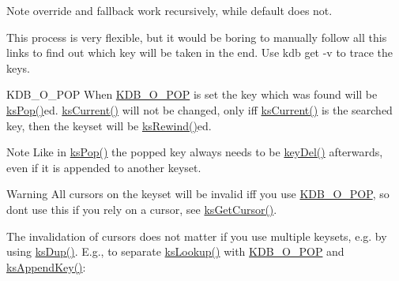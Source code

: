 \begin{DoxyNote}{Note}
override and fallback work recursively, while default does not.
\end{DoxyNote}
This process is very flexible, but it would be boring to manually follow all this links to find out which key will be taken in the end. Use {\ttfamily kdb get -\/v} to trace the keys.

\begin{DoxyParagraph}{K\+D\+B\+\_\+\+O\+\_\+\+P\+OP}
When \hyperlink{group__keyset_ggada05f4bbf46fde81d0d57df86e73d914a52fb5f2cc86773d393da62bebebf7984}{K\+D\+B\+\_\+\+O\+\_\+\+P\+OP} is set the key which was found will be \hyperlink{group__keyset_gae42530b04defb772059de0600159cf69}{ks\+Pop()}ed. \hyperlink{group__keyset_ga4287b9416912c5f2ab9c195cb74fb094}{ks\+Current()} will not be changed, only iff \hyperlink{group__keyset_ga4287b9416912c5f2ab9c195cb74fb094}{ks\+Current()} is the searched key, then the keyset will be \hyperlink{group__keyset_gabe793ff51f1728e3429c84a8a9086b70}{ks\+Rewind()}ed.
\end{DoxyParagraph}
\begin{DoxyNote}{Note}
Like in \hyperlink{group__keyset_gae42530b04defb772059de0600159cf69}{ks\+Pop()} the popped key always needs to be \hyperlink{group__key_ga3df95bbc2494e3e6703ece5639be5bb1}{key\+Del()} afterwards, even if it is appended to another keyset.
\end{DoxyNote}
\begin{DoxyWarning}{Warning}
All cursors on the keyset will be invalid iff you use \hyperlink{group__keyset_ggada05f4bbf46fde81d0d57df86e73d914a52fb5f2cc86773d393da62bebebf7984}{K\+D\+B\+\_\+\+O\+\_\+\+P\+OP}, so don\textquotesingle{}t use this if you rely on a cursor, see \hyperlink{group__keyset_gace0444eb8ec958a429794f8586fc72e7}{ks\+Get\+Cursor()}.
\end{DoxyWarning}
The invalidation of cursors does not matter if you use multiple keysets, e.\+g. by using \hyperlink{group__keyset_gac59e4b328245463f1451f68d5106151c}{ks\+Dup()}. E.\+g., to separate \hyperlink{group__keyset_ga60f1ddcf23272f2b29b90e92ebe9b56f}{ks\+Lookup()} with \hyperlink{group__keyset_ggada05f4bbf46fde81d0d57df86e73d914a52fb5f2cc86773d393da62bebebf7984}{K\+D\+B\+\_\+\+O\+\_\+\+P\+OP} and \hyperlink{group__keyset_gaa5a1d467a4d71041edce68ea7748ce45}{ks\+Append\+Key()}\+:



